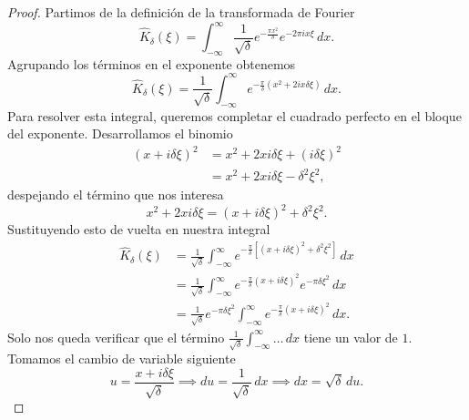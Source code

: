 \documentclass[12pt]{article}
\theoremstyle{plain}
\theoremstyle{definition}
\numberwithin{equation}{section}
\begin{document}
            \begin{proof}
                Partimos de la definición de la transformada de Fourier
                \begin{equation*}
                    \widehat{K}_\delta(\xi) = \int_{-\infty}^{\infty} \frac{1}{\sqrt{\delta}} e^{-\frac{\pi x^2}{\delta}} e^{-2\pi i x \xi} \,dx.
                \end{equation*}
                Agrupando los términos en el exponente obtenemos
                \begin{equation*}
                    \widehat{K}_\delta(\xi) = \frac{1}{\sqrt{\delta}} \int_{-\infty}^{\infty} e^{-\frac{\pi}{\delta}(x^2 + 2ix\delta\xi)} \,dx.
                \end{equation*}
                Para resolver esta integral, queremos completar el cuadrado perfecto en el bloque del exponente. Desarrollamos el binomio
                \begin{align*}
                    (x + i\delta\xi)^2 &= x^2 + 2xi\delta\xi + (i\delta\xi)^2 \\
                    &= x^2 + 2xi\delta\xi - \delta^2\xi^2,
                \end{align*}
                despejando el término que nos interesa
                \begin{equation*}
                    x^2 + 2xi\delta\xi = (x + i\delta\xi)^2 + \delta^2\xi^2.
                \end{equation*}
                Sustituyendo esto de vuelta en nuestra integral
                \begin{align*}
                    \widehat{K}_\delta(\xi) &= \frac{1}{\sqrt{\delta}} \int_{-\infty}^{\infty} e^{-\frac{\pi}{\delta}\left[(x+i\delta\xi)^2 + \delta^2\xi^2\right]} \,dx \\
                    &= \frac{1}{\sqrt{\delta}} \int_{-\infty}^{\infty} e^{-\frac{\pi}{\delta}(x+i\delta\xi)^2} e^{-\pi\delta\xi^2} \,dx \\
                    &= \frac{1}{\sqrt{\delta}} e^{-\pi\delta\xi^2} \int_{-\infty}^{\infty} e^{-\frac{\pi}{\delta}(x+i\delta\xi)^2} \,dx.
                \end{align*}
                Solo nos queda verificar que el término $\frac{1}{\sqrt{\delta}}\int_{-\infty}^{\infty} \dots \,dx$ tiene un valor de $1$.
                Tomamos el cambio de variable siguiente
                \begin{equation*}
                    u = \frac{x + i\delta\xi}{\sqrt{\delta}} \implies du = \frac{1}{\sqrt{\delta}} \,dx \implies dx = \sqrt{\delta} \,du.

\end{equation*}
\end{proof}
\end{document}
